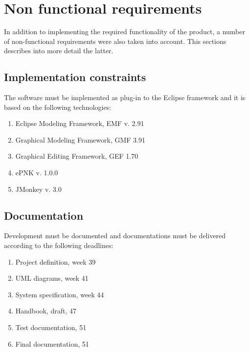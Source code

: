 \section{Non functional requirements}
\label{sec:non-functional}

In addition to implementing the required functionality of the product, a number of non-functional requirements were also taken into account. This sections describes into more detail the latter.

\subsection{Implementation constraints}
The software must be implemented as plug-in to the Eclipse framework and it is based on the following technologies:
\begin{enumerate}
	\item Eclipse Modeling Framework, EMF v. 2.91
	\item Graphical Modeling Framework, GMF 3.91
	\item Graphical Editing Framework, GEF 1.70
	\item ePNK v. 1.0.0
	\item JMonkey v. 3.0
\end{enumerate}

\subsection{Documentation}
Development must be documented and documentations must be delivered according to the following deadlines:
\begin{enumerate}
	\item Project definition, week 39
	\item UML diagrams, week 41
	\item System specification, week 44
	\item Handbook, draft, 47
	\item Test documentation, 51
	\item Final documentation, 51
\end{enumerate}

